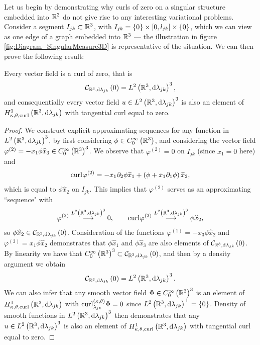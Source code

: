 Let us begin by demonstrating why curls of zero on a singular structure embedded into $\mathbb{R}^3$ do not give rise to any interesting variational problems.
Consider a segment $I_{jk}\subset\mathbb{R}^3$, with $I_{jk} = \left\{ 0 \right\}\times\left[ 0,l_{jk} \right]\times\left\{ 0 \right\}$, which we can view as one edge of a graph embedded into $\mathbb{R}^3$ --- the illustration in figure \ref{fig:Diagram_SingularMeasure3D} is representative of the situation.
We can then prove the following result:
\begin{prop} \label{prop:3DGraph-CurlsAreZero}
	Every vector field is a curl of zero, that is
	\begin{align*}
		\mathcal{C}_{ \mathbb{R}^3, \mathrm{d}\lambda_{jk}}\left( 0 \right) = L^{2}\left( \mathbb{R}^3,\mathrm{d} \lambda_{jk} \right)^3,
	\end{align*}
	and consequentially every vector field $u\in L^{2}\left( \mathbb{R}^3,\mathrm{d} \lambda_{jk} \right)^3$ is also an element of $H^1_{\kappa,\theta,\mathrm{curl}}\left( \mathbb{R}^3, \mathrm{d}\lambda_{jk} \right)$ with tangential curl equal to zero.
\end{prop}
\begin{proof}
	We construct explicit approximating sequences for any function in $L^{2}\left( \mathbb{R}^3,\mathrm{d} \lambda_{jk} \right)^3$, by first considering $\phi\in C^{\infty}_{0}\left( \mathbb{R}^3 \right)$, and considering the vector field $\varphi^{(2)} = -x_1\phi\widehat{x}_3\in C^{\infty}_{0}\left( \mathbb{R}^3 \right)^3$.
	We observe that $\varphi^{(2)}=0$ on $I_{jk}$ (since $x_1=0$ here) and 
	\begin{align*}
		\mathrm{curl}_{}\varphi^{(2)} = -x_1\partial_2\phi\widehat{x}_1 + \left( \phi + x_1\partial_1\phi \right)\widehat{x}_2,
	\end{align*}
	which is equal to $\phi\widehat{x}_2$ on $I_{jk}$.
	This implies that $\varphi^{(2)}$ serves as an approximating ``sequence" with
	\begin{align*}
		\varphi^{(2)} \overset{L^{2}\left( \mathbb{R}^3,\mathrm{d} \lambda_{jk} \right)^3}{\longrightarrow} 0, 
		\qquad
		\mathrm{curl}_{}\varphi^{(2)} \overset{L^{2}\left( \mathbb{R}^3,\mathrm{d} \lambda_{jk} \right)^3}{\longrightarrow} \phi\widehat{x}_2,
	\end{align*}
	so $\phi\widehat{x}_2\in\mathcal{C}_{ \mathbb{R}^3, \mathrm{d}\lambda_{jk}}\left( 0 \right)$.
	Consideration of the functions $\varphi^{(1)} = -x_3\phi\widehat{x}_2$ and $\varphi^{(3)}=x_1\phi\widehat{x}_2$ demonstrates that $\phi\widehat{x}_1$ and $\phi\widehat{x}_3$ are also elements of $\mathcal{C}_{ \mathbb{R}^3, \mathrm{d}\lambda_{jk}}\left( 0 \right)$.
	By linearity we have that $C^{\infty}_{0}\left( \mathbb{R}^3 \right)^3\subset\mathcal{C}_{ \mathbb{R}^3, \mathrm{d}\lambda_{jk}}\left( 0 \right)$, and then by a density argument we obtain
	\begin{align*}
		\mathcal{C}_{ \mathbb{R}^3, \mathrm{d}\lambda_{jk}}\left( 0 \right) = L^{2}\left( \mathbb{R}^3,\mathrm{d} \lambda_{jk} \right)^3.
	\end{align*}
	We can also infer that any smooth vector field $\Phi\in C^{\infty}_{0}\left( \mathbb{R}^3 \right)^3$ is an element of $H^1_{\kappa,\theta,\mathrm{curl}}\left( \mathbb{R}^3, \mathrm{d}\lambda_{jk} \right)$ with $\mathrm{curl}_{\lambda_{jk}}^{\left( \kappa, \theta \right)}\Phi = 0$ since $L^{2}\left( \mathbb{R}^3,\mathrm{d} \lambda_{jk} \right)^{\perp} = \left\{ 0 \right\}$.
	Density of smooth functions in $L^{2}\left( \mathbb{R}^3,\mathrm{d} \lambda_{jk} \right)^3$ then demonstrates that any $u\in L^{2}\left( \mathbb{R}^3,\mathrm{d} \lambda_{jk} \right)^3$ is also an element of $H^1_{\kappa,\theta,\mathrm{curl}}\left( \mathbb{R}^3, \mathrm{d}\lambda_{jk} \right)$ with tangential curl equal to zero.
\end{proof}
